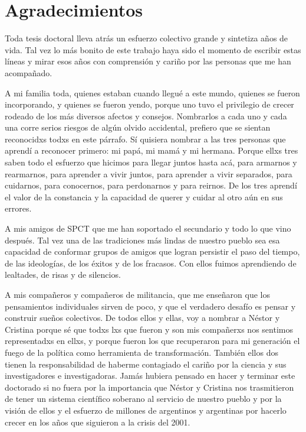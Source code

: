 \chapter*{Agradecimientos}
Toda tesis doctoral lleva atrás un esfuerzo colectivo grande y sintetiza años de vida. Tal vez lo más bonito de este trabajo haya sido el momento de escribir estas líneas y mirar esos años con comprensión y cariño por las personas que me han acompañado.

A mi familia toda, quienes estaban cuando llegué a este mundo, quienes se fueron incorporando, y quienes se fueron yendo, porque uno tuvo el privilegio de crecer rodeado de los más diversos afectos y consejos. Nombrarlos a cada uno y cada una corre serios riesgos de algún olvido accidental, prefiero que se sientan reconocidxs todxs en este párrafo. Sí quisiera nombrar a las tres personas que aprendí a reconocer primero: mi papá, mi mamá y mi hermana. Porque ellxs tres saben todo el esfuerzo que hicimos para llegar juntos hasta acá, para armarnos y rearmarnos, para aprender a vivir juntos, para aprender a vivir separados, para cuidarnos, para conocernos, para perdonarnos y para reirnos. De los tres aprendí el valor de la constancia y la capacidad de querer y cuidar al otro aún en sus errores. 

A mis amigos de SPCT que me han soportado el secundario y todo lo que vino después. Tal vez una de las tradiciones más lindas de nuestro pueblo sea esa capacidad de conformar grupos de amigos que logran persistir el paso del tiempo, de las ideologías, de los éxitos y de los fracasos. Con ellos fuimos aprendiendo de lealtades, de risas y de silencios.

A mis compañeros y compañeros de militancia, que me enseñaron que los pensamientos individuales sirven de poco, y que el verdadero desafío es pensar y construir sueños colectivos. De todos ellos y ellas, voy a nombrar a Néstor y Cristina porque sé que todxs lxs que fueron y son mis compañerxs nos sentimos representadxs en ellxs, y porque fueron los que recuperaron para mi generación el fuego de la política como herramienta de transformación. También ellos dos tienen la responsabilidad de haberme contagiado el cariño por la ciencia y sus investigadores e investigadoras. Jamás hubiera pensado en hacer y terminar este doctorado si no fuera por la importancia que Néstor y Cristina nos trasmitieron de tener un sistema científico soberano al servicio de nuestro pueblo y por la visión de ellos y el esfuerzo de millones de argentinos y argentinas por hacerlo crecer en los años que siguieron a la crisis del 2001.

